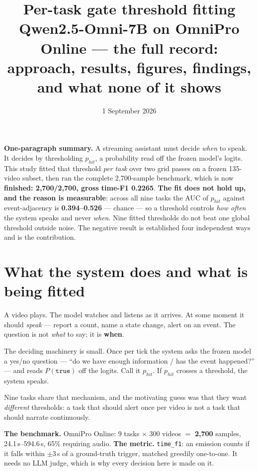 \documentclass[11pt,a4paper]{article}
\title{\textbf{Per-task gate threshold fitting}\\[3pt]
\large Qwen2.5-Omni-7B on OmniPro Online --- the full record:\\
approach, results, figures, findings, and what none of it shows}
\author{}
\date{1 September 2026}
\newenvironment{keybox}{\begin{shaded}\noindent}{\end{shaded}}
\begin{document}
\maketitle
\vspace{-2.4em}

\begin{keybox}
\textbf{One-paragraph summary.} A streaming assistant must decide \emph{when} to
speak. It decides by thresholding $p_{hit}$, a probability read off the frozen
model's logits. This study fitted that threshold \emph{per task} over two grid
passes on a frozen 135-video subset, then ran the complete 2{,}700-sample
benchmark, which is now \textbf{finished: 2{,}700/2{,}700, gross time-F1 0.2265}.
\textbf{The fit does not hold up, and the reason is measurable}: across
all nine tasks the AUC of $p_{hit}$ against event-adjacency is \textbf{0.394--0.526}
--- chance --- so a threshold controls \emph{how often} the system speaks and never
\emph{when}. Nine fitted thresholds do not beat one global threshold outside noise.
The negative result is established four independent ways and is the contribution.
\end{keybox}

\tableofcontents
\vspace{0.5em}

\section{What the system does and what is being fitted}

A video plays. The model watches and listens as it arrives. At some moment it
should \emph{speak} --- report a count, name a state change, alert on an event. The
question is not \emph{what} to say; it is \textbf{when}.

The deciding machinery is small. Once per tick the system asks the frozen model a
yes/no question --- ``do we have enough information / has the event happened?'' ---
and reads $P(\texttt{true})$ off the logits. Call it $p_{hit}$. If $p_{hit}$ crosses
a threshold, the system speaks.

Nine tasks share that mechanism, and the motivating guess was that they want
\emph{different} thresholds: a task that should alert once per video is not a task
that should narrate continuously.

\medskip
\noindent\textbf{The benchmark.} OmniPro Online: 9 tasks $\times$ 300 videos $=$
\textbf{2{,}700} samples, 24.1\,s--594.6\,s, 65\% requiring audio.
\textbf{The metric.} \texttt{time\_f1}: an emission counts if it falls within
$\pm$3\,s of a ground-truth trigger, matched greedily one-to-one. It needs no LLM
judge, which is why every decision here is made on it.
\end{document}
